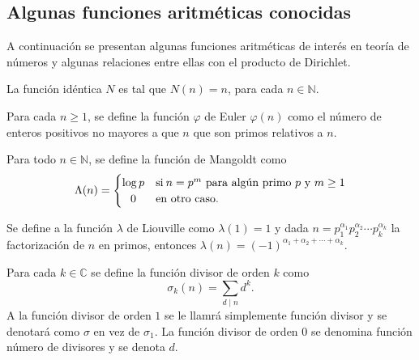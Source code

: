 \subsection{Algunas funciones aritméticas conocidas}

A continuación se presentan algunas funciones aritméticas de interés en teoría de números y algunas relaciones entre ellas con el producto de Dirichlet.

\begin{definition}
La función idéntica $N$ es tal que $N(n)=n$, para cada $n\in \mathbb{N}$.
\end{definition}

\begin{definition}
Para cada $n\geq 1$, se define la función $\varphi$ de Euler $\varphi(n)$ como el número de enteros positivos no mayores a que $n$ que son primos relativos a $n$.
\end{definition}

\begin{definition}
Para todo $n\in\mathbb{N}$, se define la función de Mangoldt como 
\begin{equation*}
	\Lambda(n) =
		\begin{cases}
			\log p & \text{si} \: n=p^m \text{ para algún primo } p \text{ y } m\geq 1\\ \hfil
			0 & \text{en otro caso}.
		\end{cases}
\end{equation*}
\end{definition}

\begin{definition}
Se define a la función $\lambda$ de Liouville como $\lambda(1)=1$ y dada $n=p_1^{\alpha_1}p_2^{\alpha_2}\cdots p_k^{\alpha_k}$ la factorización de $n$ en primos, entonces $\lambda(n)=(-1)^{\alpha_1+\alpha_2+\cdots+\alpha_k}$.
\end{definition}

\begin{definition}
Para cada $k\in\mathbb{C}$ se define la función divisor de orden $k$ como 
\begin{equation*}
	\sigma_k(n)=\sum_{d \mid n} d^k.
\end{equation*}
A la función divisor de orden $1$ se le llamrá simplemente función divisor y se denotará como $\sigma$ en vez de $\sigma_1$. La función divisor de orden $0$ se denomina función número de divisores y se denota $d$.
\end{definition}

